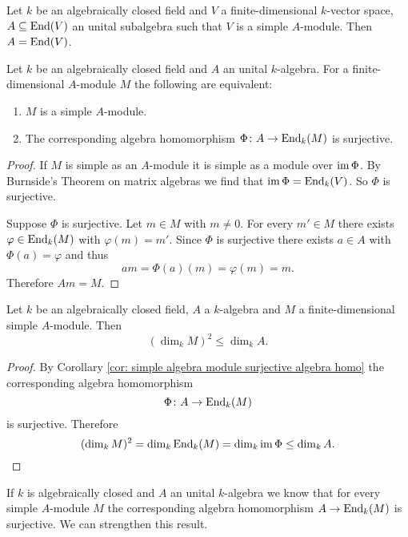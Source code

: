 \begin{cor}
 Let $k$ be an algebraically closed field and $V$ a finite-dimensional $k$-vector space, $A \subseteq \operatorname{End}(V)$ an unital subalgebra such that $V$ is a simple $A$-module. Then $A = \operatorname{End}(V)$.
\end{cor}


\begin{cor}\label{cor: simple algebra module surjective algebra homo}
 Let $k$ be an algebraically closed field and $A$ an unital $k$-algebra. For a finite-dimensional $A$-module $M$ the following are equivalent:
 \begin{enumerate}[label=\emph{\roman*})]
  \item
   $M$ is a simple $A$-module.
  \item
   The corresponding algebra homomorphism $\Phi \colon A \to \operatorname{End}_k(M)$ is surjective.
 \end{enumerate}
\end{cor}
\begin{proof}
 If $M$ is simple as an $A$-module it is simple as a module over $\operatorname{im} \Phi$. By Burnside’s Theorem on matrix algebras we find that $\operatorname{im} \Phi = \operatorname{End}_k(V)$. So $\Phi$ is surjective.
 
 Suppose $\Phi$ is surjective. Let $m \in M$ with $m \neq 0$. For every $m' \in M$ there exists $\varphi \in \operatorname{End}_k(M)$ with $\varphi(m) = m'$. Since $\Phi$ is surjective there exists $a \in A$ with $\Phi(a) = \varphi$ and thus
 \[
  am = \Phi(a)(m) = \varphi(m) = m.
 \]
 Therefore $Am = M$.
\end{proof}


\begin{cor}\label{cor: dimension simple algebra modules}
 Let $k$ be an algebraically closed field, $A$ a $k$-algebra and $M$ a finite-dimensional simple $A$-module. Then
 \[
  (\dim_k M)^2 \leq \dim_k A.
 \]
\end{cor}
\begin{proof}
 By Corollary \ref{cor: simple algebra module surjective algebra homo} the corresponding algebra homomorphism
 \[
  \Phi \colon A \to \operatorname{End}_k(M)
 \]
 is surjective. Therefore
 \[
  (\dim_k M)^2 = \dim_k \operatorname{End}_k(M) = \dim_k \operatorname{im} \Phi \leq \dim_k A.
 \]
\end{proof}


If $k$ is algebraically closed and $A$ an unital $k$-algebra we know that for every simple $A$-module $M$ the corresponding algebra homomorphism $A \to \operatorname{End}_k(M)$ is surjective. We can strengthen this result.


